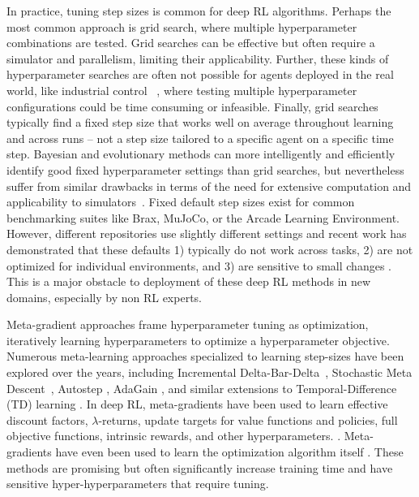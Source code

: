 \documentclass{article}
\begin{document}
In practice, tuning step sizes is common for deep RL algorithms. Perhaps the most common
approach is grid search, where multiple hyperparameter combinations are tested. Grid searches can be
effective but often require a simulator and parallelism, limiting their applicability. Further, these kinds of hyperparameter searches are
often not possible for agents deployed in the real world, like industrial control ~\citep{luo2022controlling,janjua2024gvfs}, where testing multiple
hyperparameter configurations could be time consuming or infeasible. Finally, grid searches typically find a fixed step size that
works well on average throughout learning and across runs -- not a step size tailored to a specific agent on a specific time step.
Bayesian and evolutionary methods can more intelligently and efficiently identify good fixed hyperparameter settings than
grid searches, but nevertheless suffer from similar drawbacks in terms of the need for extensive computation and applicability to simulators~\citep{parker2022automated}. Fixed default step sizes exist for common
benchmarking suites like Brax, MuJoCo, or the Arcade Learning Environment. However, different repositories use slightly different settings and recent work has demonstrated that these
defaults 1) typically do not work across tasks, 2) are not optimized for individual environments, and 3) are sensitive to
small changes \citep{patterson2024chtb,adkins2024method,eimer2023hyperparameters}. 
This is a major obstacle to deployment of these deep RL methods in new domains, especially by non RL experts.

Meta-gradient approaches frame
hyperparameter tuning as optimization, iteratively learning hyperparameters to optimize a hyperparameter
objective. Numerous meta-learning approaches specialized to learning step-sizes have been explored over the years, including Incremental Delta-Bar-Delta~\citep{sutton1992adapting}, Stochastic Meta Descent~\citep{schraudolph1999local}, Autostep \citep{mahmood2012tuning}, AdaGain \cite{jacobsen2019metadescent}, and similar extensions to Temporal-Difference
(TD) learning \citep{kearney2018tidbd,young2019metatrace,thill2015temporal}.
In deep RL, meta-gradients have been used to learn effective discount factors, $\lambda$-returns, update targets for value
functions and policies, full objective functions, intrinsic rewards, and other hyperparameters.
\citep{xu2018meta,xu2020meta,oh2020discovering,kirsch2020improving,wang2020metasac,zheng2020what,bonnet2022debiasing,zahavy2020self,zheng2018learning}.
Meta-gradients have even been used to learn the optimization algorithm itself
\citep{andrychowicz2016learning,lan2024learning}.
These methods are promising but often significantly increase training time and  have sensitive hyper-hyperparameters that require tuning.
\end{document}
